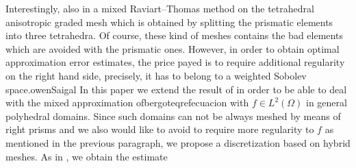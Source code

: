 Interestingly, also in \cite{MR1866274} a mixed Raviart--Thomas method on the tetrahedral anisotropic graded mesh which is obtained by splitting the prismatic elements into three tetrahedra. Of course, these kind of meshes contains the bad elements which are avoided with the prismatic ones. However, in order to obtain optimal approximation error estimates, the price payed is to require additional regularity on the right hand side, precisely, it has to belong to a weighted Sobolev space.owenSaigal
In this paper we extend the result of \cite{MR1866274} in order to be able to deal with the mixed approximation ofbergoteqref{ecuacion} with $f\in L^2(\Omega)$ in general polyhedral domains. Since such domains can not be always meshed by means of right prisms and we also would like to avoid to require more regularity to $f$ as mentioned in the previous paragraph, we propose a discretization based on hybrid meshes. As in \cite{MR1866274}, we obtain the estimate
